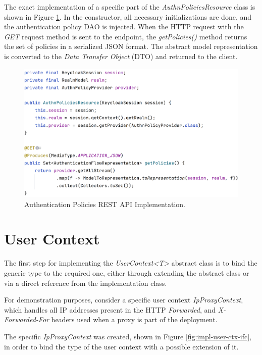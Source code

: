The exact implementation of a specific part of the \textit{AuthnPoliciesResource} class is shown in Figure \ref{fig:impl-authn-policies-rest-impl}.
In the constructor, all necessary initializations are done, and the authentication policy DAO is injected.
When the HTTP request with the \textit{GET} request method is sent to the endpoint, the \textit{getPolicies()} method returns the set of policies in a serialized JSON format.
The abstract model representation is converted to the \textit{Data Transfer Object} (DTO) and returned to the client.

\begin{figure}[htbp]
  \centering
  \includegraphics[width=1\textwidth]{img/sections/6-implementation/authn-policy-rest-example.png}
  \caption{Authentication Policies REST API Implementation.}
  \label{fig:impl-authn-policies-rest-impl}
\end{figure}

\newpage
\section{User Context}
The first step for implementing the \textit{UserContext<T>} abstract class is to bind the generic type to the required one, either through extending the abstract class or via a direct reference from the implementation class. 

For demonstration purposes, consider a specific user context \textit{IpProxyContext}, which handles all IP addresses present in the HTTP \textit{Forwarded}, and \textit{X-Forwarded-For} headers used when a proxy is part of the deployment.

The specific \textit{IpProxyContext} was created, shown in Figure \ref{fig:impl-user-ctx-ifc}, in order to bind the type of the user context with a possible extension of it.

